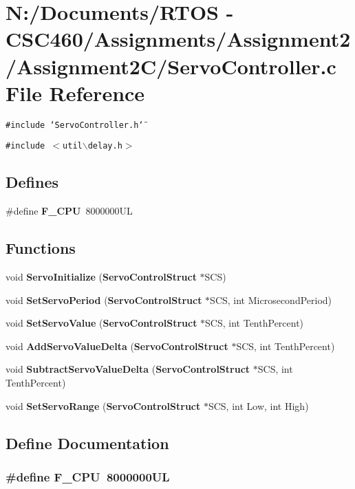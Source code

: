 \section{N:/Documents/RTOS - CSC460/Assignments/Assignment2/Assignment2C/Servo\-Controller.c File Reference}
\label{_servo_controller_8c}
{\tt \#include \char`\"{}Servo\-Controller.h\char`\"{}}\par
{\tt \#include $<$util$\backslash$delay.h$>$}\par
\subsection*{Defines}
\begin{CompactItemize}
\item 
\#define {\bf F\_\-CPU}~8000000UL
\end{CompactItemize}
\subsection*{Functions}
\begin{CompactItemize}
\item 
void {\bf Servo\-Initialize} ({\bf Servo\-Control\-Struct} $\ast$SCS)
\item 
void {\bf Set\-Servo\-Period} ({\bf Servo\-Control\-Struct} $\ast$SCS, int Microsecond\-Period)
\item 
void {\bf Set\-Servo\-Value} ({\bf Servo\-Control\-Struct} $\ast$SCS, int Tenth\-Percent)
\item 
void {\bf Add\-Servo\-Value\-Delta} ({\bf Servo\-Control\-Struct} $\ast$SCS, int Tenth\-Percent)
\item 
void {\bf Subtract\-Servo\-Value\-Delta} ({\bf Servo\-Control\-Struct} $\ast$SCS, int Tenth\-Percent)
\item 
void {\bf Set\-Servo\-Range} ({\bf Servo\-Control\-Struct} $\ast$SCS, int Low, int High)
\end{CompactItemize}


\subsection{Define Documentation}
\subsubsection{\setlength{\rightskip}{0pt plus 5cm}\#define F\_\-CPU~8000000UL}\label{_servo_controller_8c_43bafb28b29491ec7f871319b5a3b2f8}




